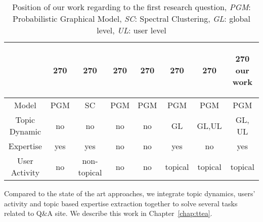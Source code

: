     
        \begin{table}[htp]
        \centering
        \begin{tabular}{c c c c c c c c}
        &
        \begin{turn}{270}
            \cite{yang2013cqarank} 
        \end{turn} 
         &
        \begin{turn}{270}
            \cite{Chang:2013}  %
        \end{turn} 
        &
        \begin{turn}{270} 
            \cite{guo2008tapping} %
        \end{turn}
        &
        \begin{turn}{270} 
            \cite{blei2003latent} %
        \end{turn}
        &
        \begin{turn}{270}
            \cite{hu2014user} %
        \end{turn}
        &
        \begin{turn}{270}
            \cite{chp7diao2012finding} %
        \end{turn}
        &
        \begin{turn}{270}
        our work
        \end{turn}
        \\ \hline
        Model & PGM &SC & PGM & PGM & PGM & PGM& PGM\\ \hline
        Topic Dynamic & no & no & no & no & GL & GL,UL & GL, UL \\ \hline
        Expertise & yes & yes& no & no & yes &no &yes   \\ \hline
        User Activity& no & non-topical & no & no &topical & topical & topical \\ \hline
        \end{tabular}
        \caption{Position of our work regarding to the first research question, \textit{PGM}: Probabilistic Graphical Model, \textit{SC}: Spectral Clustering, \textit{GL}: global level, \textit{UL}: user level}
        \label{tab:rq5compare}
    \end{table}
Compared to the state of the art approaches, we integrate topic dynamics, users' activity and topic based expertise extraction together to solve several tasks related to Q\&A site. We describe this work in Chapter~\ref{chap:ttea}.